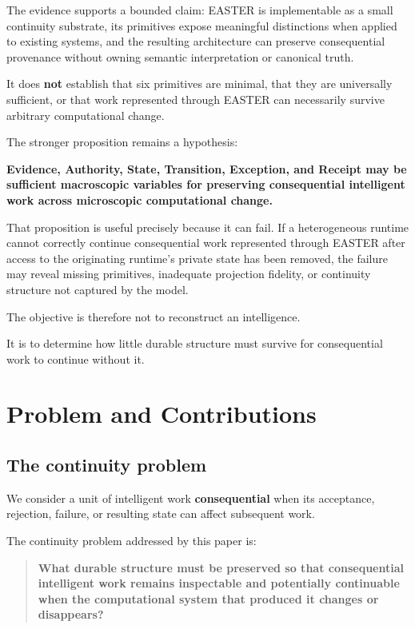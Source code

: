 \documentclass[11pt]{article}
\begin{document}
The evidence supports a bounded claim: EASTER is implementable as a small continuity substrate, its primitives expose meaningful distinctions when applied to existing systems, and the resulting architecture can preserve consequential provenance without owning semantic interpretation or canonical truth.

It does \textbf{not} establish that six primitives are minimal, that they are universally sufficient, or that work represented through EASTER can necessarily survive arbitrary computational change.

The stronger proposition remains a hypothesis:

\textbf{Evidence, Authority, State, Transition, Exception, and Receipt may be sufficient macroscopic variables for preserving consequential intelligent work across microscopic computational change.}

That proposition is useful precisely because it can fail. If a heterogeneous runtime cannot correctly continue consequential work represented through EASTER after access to the originating runtime's private state has been removed, the failure may reveal missing primitives, inadequate projection fidelity, or continuity structure not captured by the model.

The objective is therefore not to reconstruct an intelligence.

It is to determine how little durable structure must survive for consequential work to continue without it.

\section{Problem and Contributions}

\subsection{The continuity problem}

We consider a unit of intelligent work \textbf{consequential} when its acceptance, rejection, failure, or resulting state can affect subsequent work.

The continuity problem addressed by this paper is:

\begin{quote}
\textbf{What durable structure must be preserved so that consequential intelligent work remains inspectable and potentially continuable when the computational system that produced it changes or disappears?}
\end{quote}
\end{document}
